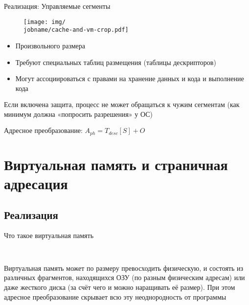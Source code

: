 \documentclass[xetex,aspectratio=43]{beamer}
\begin{document}
\begin{frame}{Реализация: Управляемые сегменты}

    \begin{figure}
        \texttt{[image: img/\\jobname/cache-and-vm-crop.pdf]}
        \vspace{-5mm}
    \end{figure}

    \begin{itemize}
        \tightlist
        \item
        Произвольного размера
        \item
        Требуют специальных таблиц размещения (таблицы дескрипторов)
        \item
        Могут ассоциироваться с правами на хранение данных и кода и выполнение
        кода
    \end{itemize}

    \pause

    Если включена защита, процесс не может обращаться к чужим сегментам (как
    минимум должна «попросить разрешения» у ОС)

    Адресное преобразование: \(A_{ph} = T_{desc}[S] + O\)

\end{frame}

\section{Виртуальная память и страничная адресация}

\subsection{Реализация}

\begin{frame}{Что такое виртуальная память}

    ~

    Виртуальная память может по размеру превосходить физическую, и состоять
    из различных фрагментов, находящихся ОЗУ (по разным физическим адресам)
    или даже жесткого диска (за счёт чего и можно наращивать её размер). При
    этом адресное преобразование скрывает всю эту неоднородность от
    программы
\end{frame}
\end{document}
